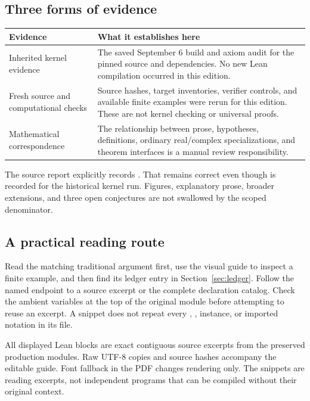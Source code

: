 \subsection{Three forms of evidence}
\begin{longtable}{@{}p{.23\linewidth}p{.70\linewidth}@{}}
\toprule Evidence & What it establishes here\\\midrule\endhead
Inherited kernel evidence & The saved September 6 build and axiom audit for the pinned source and dependencies. No new Lean compilation occurred in this edition.\\
Fresh source and computational checks & Source hashes, target inventories, verifier controls, and available finite examples were rerun for this edition. These are not kernel checking or universal proofs.\\
Mathematical correspondence & The relationship between prose, hypotheses, definitions, ordinary real/complex specializations, and theorem interfaces is a manual review responsibility.\\
\bottomrule\end{longtable}

The source report explicitly records . That remains correct even though  is recorded for the historical kernel run. Figures, explanatory prose, broader extensions, and three open conjectures are not swallowed by the scoped denominator.

\subsection{A practical reading route}
Read the matching traditional argument first, use the visual guide to inspect a finite example, and then find its ledger entry in Section~\ref{sec:ledger}. Follow the named endpoint to a source excerpt or the complete declaration catalog. Check the ambient variables at the top of the original module before attempting to reuse an excerpt. A snippet does not repeat every , , instance, or imported notation in its file.

All displayed Lean blocks are exact contiguous source excerpts from the preserved production modules. Raw UTF-8 copies and source hashes accompany the editable guide. Font fallback in the PDF changes rendering only. The snippets are reading excerpts, not independent programs that can be compiled without their original context.

